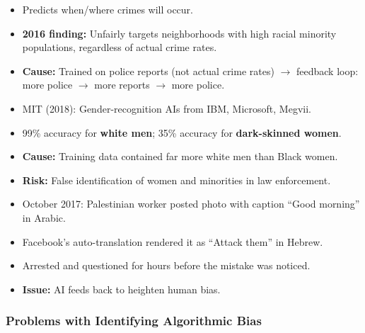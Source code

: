 \begin{exbox}
\begin{itemize}
  \item Predicts when/where crimes will occur.
  \item \textbf{2016 finding:} Unfairly targets neighborhoods with high racial minority populations, regardless of actual crime rates.
  \item \textbf{Cause:} Trained on police reports (not actual crime rates) $\to$ feedback loop: more police $\to$ more reports $\to$ more police.
\end{itemize}
\end{exbox}

\begin{exbox}
\begin{itemize}
  \item MIT (2018): Gender-recognition AIs from IBM, Microsoft, Megvii.
  \item 99\% accuracy for \textbf{white men}; 35\% accuracy for \textbf{dark-skinned women}.
  \item \textbf{Cause:} Training data contained far more white men than Black women.
  \item \textbf{Risk:} False identification of women and minorities in law enforcement.
\end{itemize}
\end{exbox}

\begin{exbox}
\begin{itemize}
  \item October 2017: Palestinian worker posted photo with caption ``Good morning'' in Arabic.
  \item Facebook's auto-translation rendered it as ``Attack them'' in Hebrew.
  \item Arrested and questioned for hours before the mistake was noticed.
  \item \textbf{Issue:} AI feeds back to heighten human bias.
\end{itemize}
\end{exbox}

\bigseparator

\subsubsection{Problems with Identifying Algorithmic Bias}

